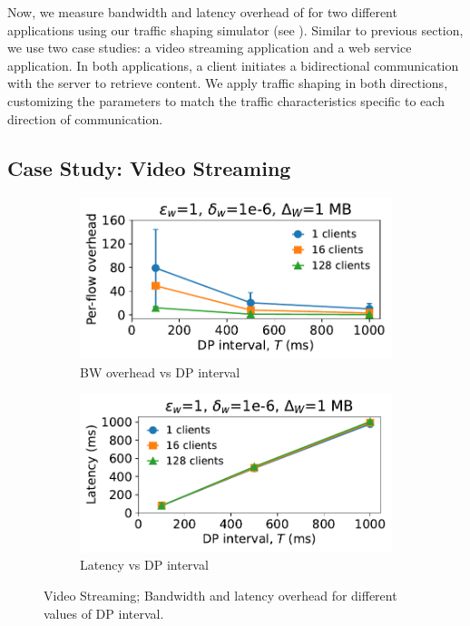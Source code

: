 Now, we measure bandwidth and latency overhead of {\sys} for two different applications using our traffic shaping simulator (see ).
Similar to previous section, we use two case studies: a video streaming application and a web service application. 
In both applications, a client initiates a bidirectional communication with the server to retrieve content.
We apply traffic shaping in both directions, customizing the parameters to match the traffic characteristics specific to each direction of communication.


\subsection{Case Study: Video Streaming}\label{subsec:eval-bw-video}
\begin{figure}[t]
  \centering
  \begin{subfigure}{0.49\columnwidth}
      \centering
      \includegraphics[width=\textwidth]{plots/overhead_vs_dp_interval_video.pdf}
      \caption{BW overhead vs DP interval}
      \label{fig:video-overhead-vs-dpInt}
  \end{subfigure}
  \hfill
  \begin{subfigure}{0.49\columnwidth}
      \centering
      \includegraphics[width=\textwidth]{plots/latency_vs_dp_interval_video.pdf}
      \caption{Latency vs DP interval}
      \label{fig:video-latency-vs-dpInt}
  \end{subfigure}
  \caption{Video Streaming; Bandwidth and latency overhead for different values of DP interval.
  }
\end{figure}

